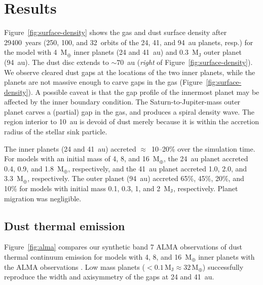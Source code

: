 \documentclass[usenatbib,a4paper,times]{mnras}
\renewcommand{\earth}{\mathrm{M}_{\oplus}}
\begin{document}
\section{Results}
\label{sec:results}

Figure~\ref{fig:surface-density} shows the gas and dust surface density after
29400~years (250, 100, and 32~orbits of the 24, 41, and 94~au planets, resp.)
for the model with 4~$\earth{}$ inner planets (24 and 41~au) and
0.3~$\mathrm{M_J}$ outer planet (94~au). The dust disc extends to $\sim 70$~au
(\textit{right} of Figure~\ref{fig:surface-density}). We observe cleared dust
gaps at the locations of the two inner planets, while the planets are not
massive enough to carve gaps in the gas (Figure~\ref{fig:surface-density}).
A possible caveat is that the gap profile of the innermost planet may be
affected by the inner boundary condition. The Saturn-to-Jupiter-mass outer
planet carves a (partial) gap in the gas, and produces a spiral density wave.
The region interior to 10~au is devoid of dust merely because it is within the
accretion radius of the stellar sink particle.

The inner planets (24 and 41~au) accreted $\approx$~10--20\% over the simulation
time. For models with an initial mass of 4, 8, and 16~$\earth{}$, the 24~au
planet accreted 0.4, 0.9, and 1.8~$\earth{}$, respectively, and the 41~au planet
accreted 1.0, 2.0, and 3.3~$\earth{}$, respectively. The outer planet (94~au)
accreted 65\%, 45\%, 20\%, and 10\% for models with initial mass 0.1, 0.3, 1,
and 2~$\mathrm{M_J}$, respectively. Planet migration was negligible.




\subsection{Dust thermal emission}

Figure~\ref{fig:alma} compares our synthetic band 7 ALMA observations of dust
thermal continuum emission for models with 4, 8, and 16~$\earth{}$ inner planets
with the ALMA observations \citep{andrews:2016}. Low mass planets ($<
0.1\,\mathrm{M_J} \approx 32\,\earth{}$) successfully reproduce the width and
axisymmetry of the gaps at 24 and 41~au.
\end{document}
